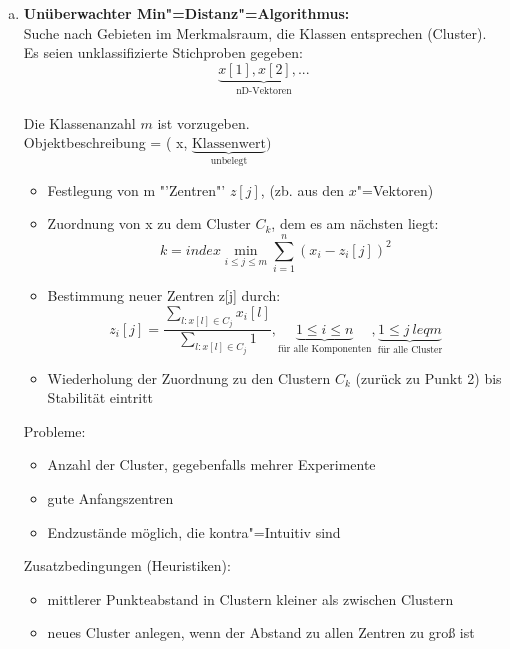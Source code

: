 \documentclass[a4paper,12pt]{scrreprt}
\newcommand{\itemd}[1]{\item{\textbf{#1}} }
\begin{document}
\begin{enumerate}[a)]
\itemd{ Unüberwachter Min"=Distanz"=Algorithmus:}\\
Suche nach Gebieten im Merkmalsraum, die Klassen entsprechen (Cluster).\\
Es seien unklassifizierte Stichproben gegeben:\\
$$ \underbrace{x[1],x[2],...}_{\text{nD-Vektoren}}$$ \\
Die Klassenanzahl $m$ ist vorzugeben.\\
Objektbeschreibung = ( x, $\underbrace{\text{Klassenwert}}_{\text{unbelegt}})$\\
\begin{itemize}
\item Festlegung von m "'Zentren"' $z[j]$, (zb. aus den $x$"=Vektoren)
\item Zuordnung von x zu dem Cluster $C_k$, dem es am nächsten liegt:
  $$k=index{\min\limits_{i\le j\le m}\sum\limits^n_{i=1}(x_i-z_i[j])^2}$$
\item Bestimmung neuer Zentren z[j] durch:\\
  $$z_i[j]=\frac{\sum\limits_{l:x[l]\in C_j} x_i[l]}{\sum\limits_{l:x[l]\in C_j} 1} ,\underbrace{1 \leq i \leq n}_{\text{für alle Komponenten}} , \underbrace{1 \leq j\ leq m}_{\text{für alle Cluster}}$$
  \item Wiederholung der Zuordnung zu den Clustern $C_k$ (zurück zu Punkt 2) bis Stabilität eintritt
\end{itemize}

Probleme:
\begin{itemize}
\item Anzahl der Cluster, gegebenfalls mehrer Experimente
\item gute Anfangszentren
\item Endzustände möglich, die kontra"=Intuitiv sind
\end{itemize}

Zusatzbedingungen (Heuristiken):
\begin{itemize}
\item mittlerer Punkteabstand in Clustern kleiner als zwischen Clustern
\item neues Cluster anlegen, wenn der Abstand zu allen Zentren zu groß
  ist
\end{itemize}


\end{enumerate}
\end{document}
